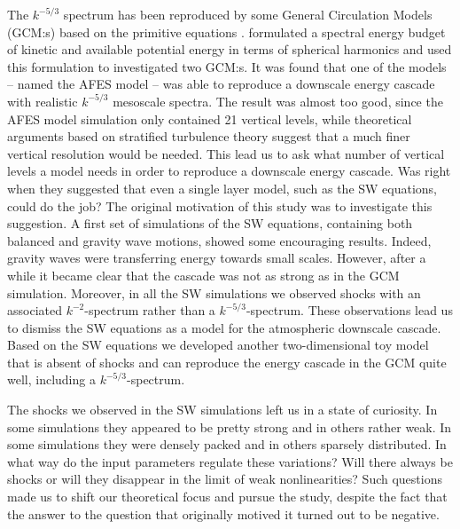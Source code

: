 \documentclass{jfm}
\begin{document}
The $ k^{-5/3} $ spectrum has been reproduced 
 by some General Circulation Models (GCM:s) based on the primitive
equations \cite[]{KoshykHamilton2001, Skamarock2004,
Hamilton_etal2008}.  \cite{AugierLindborg2013}  formulated a spectral energy budget of kinetic and available potential energy in terms of spherical harmonics and used this formulation to investigated two GCM:s. It was found that one of the models -- named the AFES model -- was able to reproduce a downscale energy cascade with realistic $ k^{-5/3} $ mesoscale spectra. The result was almost too good, since the AFES model simulation only contained 21 vertical levels, while theoretical arguments based on stratified turbulence theory \cite[]{Lindborg2006} suggest that a much finer vertical resolution would be needed. This lead us to ask what number of vertical levels a model needs in order  to reproduce a downscale energy cascade. Was \cite{YuanHamilton1994}  right  when they suggested that even a single layer model, such as the SW equations, could do the job? 
The original motivation of this study was to investigate this suggestion. A first set of simulations of the SW equations, containing both balanced and gravity wave motions, showed some encouraging results. Indeed, gravity waves were transferring energy towards small scales. However, after a while it became clear that the cascade was not as strong as in the GCM simulation.  Moreover, in all the SW simulations we observed shocks with an associated $ k^{-2} $-spectrum rather than a $ k^{-5/3} $-spectrum. These observations lead us to dismiss the SW equations as a model for the atmospheric downscale cascade. Based on the SW equations we developed another two-dimensional toy model  \cite[]{LindborgMohanan} that is absent of shocks and can reproduce the energy cascade in the GCM quite well, including a $ k^{-5/3}  $-spectrum.

The shocks we observed in the SW simulations left us in a state of curiosity. In some simulations they appeared to be pretty strong and in others rather weak. In some simulations they were densely packed and in others sparsely distributed. 
In what way  do the input parameters regulate these variations? Will there always be shocks or will they disappear in the limit of weak nonlinearities?  Such questions made us to shift our theoretical focus and pursue the study, despite the fact that the answer to the question that originally motived it turned out to be negative.  
 
\end{document}
